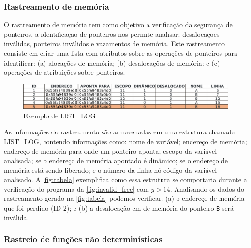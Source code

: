 \subsubsection{Rastreamento de memória}

O rastreamento de memória tem como objetivo a verificação da segurança de ponteiros, a identificação de ponteiros nos permite analisar: desalocações inválidas, ponteiros inválidos e vazamentos de memória. Este rastreamento consiste em criar uma lista com atributos sobre as operações de ponteiros para identificar: 
(a) alocações de memória; 
(b) desalocações de memória; e 
(c) operações de atribuições sobre ponteiros. 

\begin{figure}[htb]
	\caption{\label{fig:tabela} Exemplo de LIST\_LOG}
	\begin{center}
	    \includegraphics[scale=0.4]{resources/tabela_list_log.png}
	\end{center}
\end{figure}

As informações do rastreamento são armazenadas em uma estrutura chamada LIST\_LOG, contendo informações como: 
nome de variável; 
endereço de memória; 
endereço de memória para onde um ponteiro aponta; 
escopo da variável analisada; 
se o endereço de memória apontado é dinâmico; 
se o endereço de memória está sendo liberado; e 
o número da linha nó código da variável analisado. 
A \autoref{fig:tabela} exemplifica como essa estrutura se comportaria durante a verificação do programa da \autoref{fig:invalid_free} com $y > 14$. 
Analisando os dados do rastreamento gerado na \autoref{fig:tabela} podemos verificar: 
(a) o endereço de memória que foi perdido (ID $2$); e 
(b) a desalocação em de memória do ponteiro \texttt{B} será inválida.

\subsubsection{Rastreio de funções não determinísticas}

